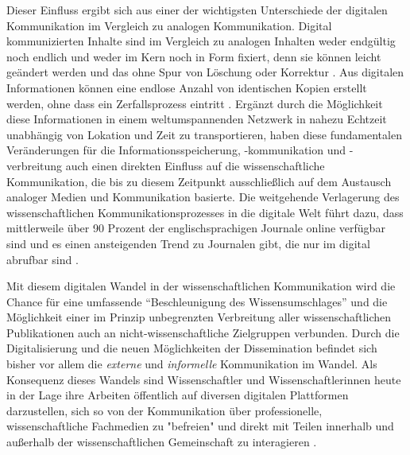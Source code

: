 Dieser Einfluss ergibt sich aus einer der wichtigsten Unterschiede der digitalen Kommunikation im Vergleich zu analogen Kommunikation. Digital kommunizierten Inhalte sind im Vergleich zu analogen Inhalten weder endgültig noch endlich und weder im Kern noch in Form fixiert, denn sie können leicht geändert werden und das ohne Spur von Löschung oder Korrektur \cite{smith_1999_digitize}. Aus digitalen Informationen können eine endlose Anzahl von identischen Kopien erstellt werden, ohne dass ein Zerfallsprozess eintritt \cite{smith_1999_digitize}. Ergänzt durch die Möglichkeit diese Informationen in einem weltumspannenden Netzwerk in nahezu Echtzeit unabhängig von Lokation und Zeit zu transportieren, haben diese fundamentalen Veränderungen für die Informationsspeicherung, -kommunikation und -verbreitung auch einen direkten Einfluss auf die wissenschaftliche Kommunikation, die bis zu diesem Zeitpunkt ausschließlich auf dem Austausch analoger Medien und Kommunikation basierte. Die weitgehende Verlagerung des wissenschaftlichen Kommunikationsprozesses in die digitale Welt führt dazu, dass mittlerweile über 90 Prozent der englischsprachigen Journale online verfügbar sind und es einen ansteigenden Trend zu Journalen gibt, die nur im digital abrufbar sind \cite{cope2014future} \cite{cite:5}.

Mit diesem digitalen Wandel in der wissenschaftlichen Kommunikation wird die Chance für eine umfassende “Beschleunigung des Wissensumschlages” \cite{Wenzel_2003} und die Möglichkeit einer im Prinzip unbegrenzten Verbreitung aller wissenschaftlichen Publikationen \cite{bbaw_publizieren_2015} \cite{yiotis_2013_open} auch an nicht-wissenschaftliche Zielgruppen \cite{Konneker_2013} verbunden. Durch die Digitalisierung und die neuen Möglichkeiten der Dissemination befindet sich bisher vor allem die \textit{externe} und \textit{informelle} Kommunikation im Wandel. Als Konsequenz dieses Wandels sind Wissenschaftler und Wissenschaftlerinnen heute in der Lage ihre Arbeiten öffentlich auf diversen digitalen Plattformen darzustellen, sich so von der Kommunikation über professionelle, wissenschaftliche Fachmedien zu "befreien" und direkt mit Teilen innerhalb und außerhalb der wissenschaftlichen Gemeinschaft zu interagieren \cite{Konneker_2013}.

